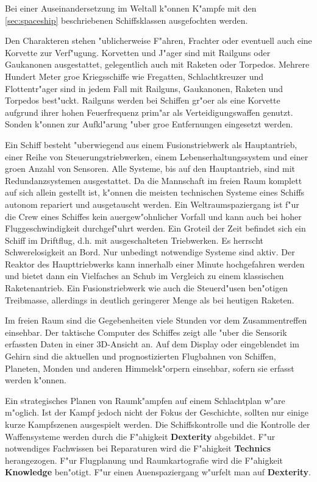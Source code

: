 Bei einer Auseinandersetzung im Weltall k"onnen K"ampfe mit den \cref{sec:spaceship} beschriebenen Schiffsklassen ausgefochten werden.

Den Charakteren stehen "ublicherweise F"ahren, Frachter oder eventuell auch eine Korvette zur Verf"ugung. Korvetten und J"ager sind mit Railguns oder Gau\3kanonen ausgestattet, gelegentlich auch mit Raketen oder Torpedos. Mehrere Hundert Meter gro\3e Kriegsschiffe wie Fregatten, Schlachtkreuzer und Flottentr"ager sind in jedem Fall mit Railguns, Gau\3kanonen, Raketen und Torpedos best"uckt. Railguns werden bei Schiffen gr"o\3er als eine Korvette aufgrund ihrer hohen Feuerfrequenz prim"ar als Verteidigungswaffen genutzt. Sonden k"onnen zur Aufkl"arung "uber gro\3e Entfernungen eingesetzt werden.

Ein Schiff besteht "uberwiegend aus einem Fusionstriebwerk als Hauptantrieb, einer Reihe von Steuerungstriebwerken, einem Lebenserhaltungssystem und einer gro\3en Anzahl von Sensoren. Alle Systeme, bis auf den Hauptantrieb, sind mit Redundanzsystemen ausgestattet. Da die Mannschaft im freien Raum komplett auf sich allein gestellt ist, k"onnen die meisten technischen Systeme eines Schiffs autonom repariert und ausgetauscht werden. Ein Weltraumspaziergang ist f"ur die Crew eines Schiffes kein au\3ergew"ohnlicher Vorfall und kann auch bei hoher Fluggeschwindigkeit durchgef"uhrt werden. Ein Gro\3teil der Zeit befindet sich ein Schiff im Driftflug, d.h. mit ausgeschalteten Triebwerken. Es herrscht Schwerelosigkeit an Bord. Nur unbedingt notwendige Systeme sind aktiv. Der Reaktor des Haupttriebwerks kann innerhalb einer Minute hochgefahren werden und bietet dann ein Vielfaches an Schub im Vergleich zu einem klassischen Raketenantrieb. Ein Fusionstriebwerk wie auch die Steuerd"usen ben"otigen Treibmasse, allerdings in deutlich geringerer Menge als bei heutigen Raketen.

Im freien Raum sind die Gegebenheiten viele Stunden vor dem Zusammentreffen einsehbar. Der taktische Computer des Schiffes zeigt alle "uber die Sensorik erfassten Daten in einer 3D-Ansicht an. Auf dem Display oder eingeblendet im Gehirn sind die aktuellen und prognostizierten Flugbahnen von Schiffen, Planeten, Monden und anderen Himmelsk"orpern einsehbar, sofern sie erfasst werden k"onnen.

Ein strategisches Planen von Raumk"ampfen auf einem Schlachtplan w"are m"oglich. Ist der Kampf jedoch nicht der Fokus der Geschichte, sollten nur einige kurze Kampfszenen ausgespielt werden. Die Schiffskontrolle und die Kontrolle der Waffensysteme werden durch die F"ahigkeit \textbf{Dexterity} abgebildet. F"ur notwendiges Fachwissen bei Reparaturen wird die F"ahigkeit \textbf{Technics} herangezogen. F"ur Flugplanung und Raumkartografie wird die F"ahigkeit \textbf{Knowledge} ben"otigt. F"ur einen Au\3enspaziergang w"urfelt man auf \textbf{Dexterity}.
